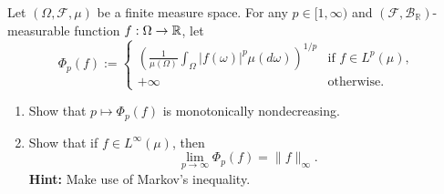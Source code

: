 \begin{problem}
	Let $(\Omega,\mathcal{F},\mu)$ be a finite measure space. For any $p\in[1,\infty)$ and $(\mathcal{F},\mathcal{B}_\mathbb{R})$-measurable function $f:\Omega\to\mathbb R$, let 
	\[
		\Phi_p(f) := \begin{cases}\displaystyle
			\left(\frac{1}{\mu(\Omega)}\int_\Omega |f(\omega)|^p \mu(d\omega)\right)^{1/p} &\text{if $f\in L^p(\mu)$},\\
			+\infty &\text{otherwise}.
		\end{cases}
	\]
	\begin{enumerate}[label={(\alph*)}]
		\item Show that $p\mapsto \Phi_p(f)$ is monotonically nondecreasing.
		\item Show that if $f\in L^\infty(\mu)$, then
		\[
			\lim_{p\to\infty} \Phi_p(f) = \|f\|_\infty.
		\]
			\textbf{Hint:} Make use of Markov's inequality.
	\end{enumerate}
\end{problem}






